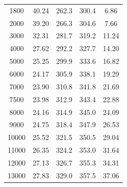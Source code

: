 \documentclass[12pt]{extarticle}
\begin{document}
\begin{table}[H]
\begin{tabular}{|c|c|c|c|c|}
    		1800  & 40.24                      & 262.3                       & 300.4                                        & 6.86                                \\
    		2000  & 39.20                      & 266.3                       & 304.6                                        & 7.66                                \\
    		3000  & 32.31                      & 281.7                       & 319.2                                        & 11.24                               \\
    		4000  & 27.62                      & 292.2                       & 327.7                                        & 14.20                               \\
    		5000  & 25.25                      & 299.9                       & 333.6                                        & 16.82                               \\
    		6000  & 24.17                      & 305.9                       & 338.1                                        & 19.29                               \\
    		7000  & 23.90                      & 310.8                       & 341.8                                        & 21.69                               \\
    		7500  & 23.98                      & 312.9                       & 343.4                                        & 22.88                               \\
    		8000  & 24.16                      & 314.9                       & 345.0                                        & 24.09                               \\
    		9000  & 24.75                      & 318.4                       & 347.9                                        & 26.53                               \\
    		10000 & 25.52                      & 321.5                       & 350.5                                        & 29.04                               \\
    		11000 & 26.35                      & 324.2                       & 353.0                                        & 31.64                               \\
    		12000 & 27.13                      & 326.7                       & 355.3                                        & 34.31                               \\
    		13000 & 27.83                      & 329.0                       & 357.5                                        & 37.06                               \\

\end{tabular}
\end{table}
\end{document}
